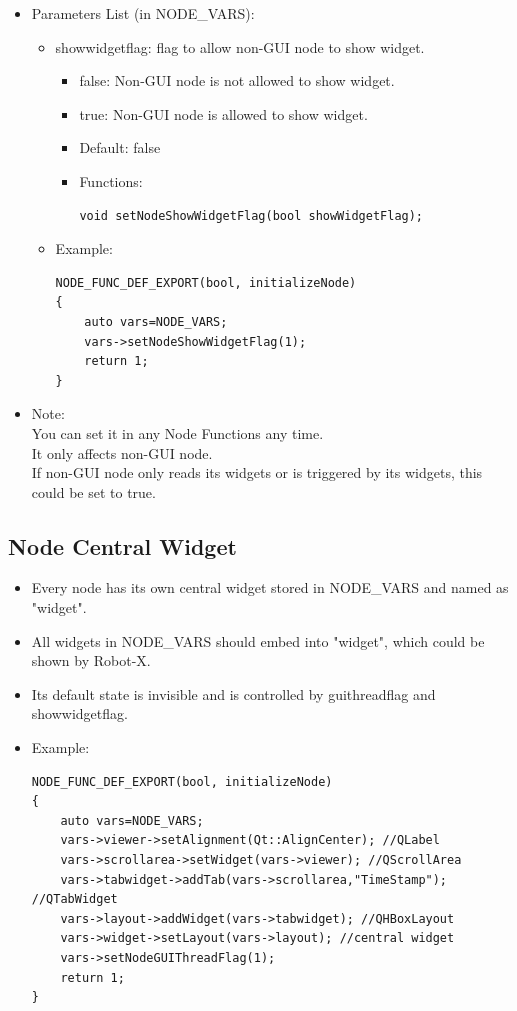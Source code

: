 \documentclass[a4paper,10pt]{book}
\begin{document}
\begin{mdframed}
\begin{itemize}
 \item Parameters List (in NODE\_VARS):
 \begin{itemize}
  \item showwidgetflag: flag to allow non-GUI node to show widget.
  \begin{itemize}
   \item false: Non-GUI node is not allowed to show widget.
   \item true: Non-GUI node is allowed to show widget.
   \item Default: false
   \item Functions:
   \begin{verbatim}
void setNodeShowWidgetFlag(bool showWidgetFlag);
   \end{verbatim}
  \end{itemize}
  \item Example:
  \begin{verbatim}
NODE_FUNC_DEF_EXPORT(bool, initializeNode)
{
    auto vars=NODE_VARS;
    vars->setNodeShowWidgetFlag(1);
    return 1;
}
\end{verbatim}
 \end{itemize}
 \item Note: \\ You can set it in any Node Functions any time. \\ It only affects non-GUI node. \\ If non-GUI node only reads its widgets or is triggered by its widgets, this could be set to true.
\end{itemize}
\end{mdframed}

\subsection{Node Central Widget}

\begin{mdframed}
\begin{itemize}
 \item Every node has its own central widget stored in NODE\_VARS and named as "widget".
 \item All widgets in NODE\_VARS should embed into "widget", which could be shown by Robot-X.
 \item Its default state is invisible and is controlled by guithreadflag and showwidgetflag.
 \item Example:
 \begin{verbatim}
NODE_FUNC_DEF_EXPORT(bool, initializeNode)
{
    auto vars=NODE_VARS;
    vars->viewer->setAlignment(Qt::AlignCenter); //QLabel
    vars->scrollarea->setWidget(vars->viewer); //QScrollArea
    vars->tabwidget->addTab(vars->scrollarea,"TimeStamp"); //QTabWidget
    vars->layout->addWidget(vars->tabwidget); //QHBoxLayout
    vars->widget->setLayout(vars->layout); //central widget
    vars->setNodeGUIThreadFlag(1);
    return 1;
}
 \end{verbatim}

\end{itemize}

\end{mdframed}
\end{document}
